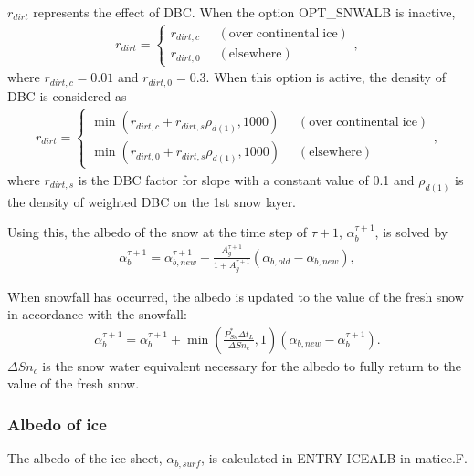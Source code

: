 \(r_{dirt}\) represents the effect of DBC. When the option OPT\_SNWALB is inactive, \begin{eqnarray}
r_{dirt} = \left\{ \begin{aligned}
 r_{dirt,c} \;\;& \mathrm{(over \; continental \; ice)} \\
 r_{dirt,0} \;\;& \mathrm{(elsewhere)}
\end{aligned} \right., \label{8-62}
\end{eqnarray} where \(r_{dirt,c} = 0.01\) and \(r_{dirt,0} = 0.3\). When this option is active, the density of DBC is considered as \begin{eqnarray}
r_{dirt} = \left\{ \begin{aligned}
 \min(r_{dirt,c} + r_{dirt,s}\rho_{d(1)}, 1000) \;\;& \mathrm{(over \; continental \; ice)} \\
 \min(r_{dirt,0} + r_{dirt,s}\rho_{d(1)}, 1000) \;\;& \mathrm{(elsewhere)}
\end{aligned} \right., \label{8-63}
\end{eqnarray} where \(r_{dirt,s}\) is the DBC factor for slope with a constant value of 0.1 and \(\rho_{d(1)}\) is the density of weighted DBC on the 1st snow layer.

Using this, the albedo of the snow at the time step of \(\tau+1\), \(\alpha_b^{\tau+1}\), is solved by \begin{eqnarray}
\alpha_b^{\tau+1} = \alpha_{b,new}^{\tau+1} + \frac{A_g^{\tau+1}}{1+A_g^{\tau+1}} (\alpha_{b,old}-\alpha_{b,new}), \label{8-64}
\end{eqnarray}

When snowfall has occurred, the albedo is updated to the value of the fresh snow in accordance with the snowfall: \begin{eqnarray}
\alpha_b^{\tau+1} = \alpha_b^{\tau+1} + \min\left( \frac{P_{Sn}^{\ast} \Delta t_L}{\Delta Sn_c}, 1 \right) (\alpha_{b,new} - \alpha_b^{\tau+1}). \label{8-65}
\end{eqnarray} \(\Delta Sn_c\) is the snow water equivalent necessary for the albedo to fully return to the value of the fresh snow.

\subsubsection{Albedo of ice}\label{albedo-of-ice}

The albedo of the ice sheet, \(\alpha_{b,surf}\), is calculated in ENTRY ICEALB in matice.F.

